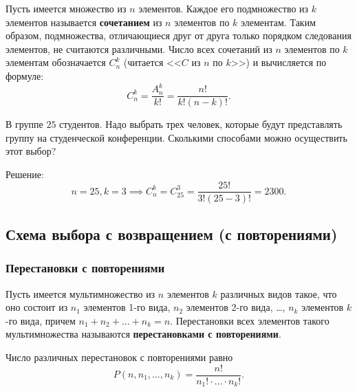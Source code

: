 Пусть имеется множество из \(n\) элементов. Каждое его подмножество из \(k\) элементов называется \textbf{сочетанием} из \(n\) элементов по \(k\) элементам. Таким образом, подмножества, отличающиеся друг от друга только порядком следования элементов, не считаются различными. Число всех сочетаний из \(n\) элементов по \(k\) элементам обозначается \(C_n^k\) (читается <<\(C\) из \(n\) по \(k\)>>) и вычисляется по формуле:
\[
    C_n^k = \frac{A_n^k}{k!} = \frac{n!}{k! (n - k)!}.
\]

\begin{example*}
    В группе \(25\) студентов. Надо выбрать трех человек, которые будут представлять группу на студенческой конференции. Сколькими способами можно осуществить этот выбор?

    Решение:
    \[
        n = 25, k = 3
        \implies
        C_n^k = C_{25}^3 = \frac{25!}{3! (25 - 3)!} = 2300.
    \]
\end{example*}

\subsection{Схема выбора с возвращением (с повторениями)}

\subsubsection{Перестановки с повторениями}

Пусть имеется мультимножество из \(n\) элементов \(k\) различных видов такое, что оно состоит из \(n_1\) элементов 1-го вида, \(n_2\) элементов 2-го вида, \ldots, \(n_k\) элементов \(k\)-го вида, причем \(n_1 + n_2 + \ldots + n_k = n\). Перестановки всех элементов такого мультимножества называются \textbf{перестановками с повторениями}.

\begin{theorem*}
    Число различных перестановок с повторениями равно
    \[
        P(n, n_1, \ldots, n_k) = \frac{n!}{n_1! \cdot \ldots \cdot n_k!}.
    \]
\end{theorem*}

